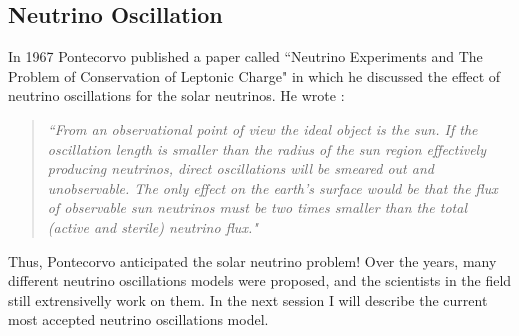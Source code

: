 \subsection{Neutrino Oscillation}

In 1967 Pontecorvo published a paper called ``Neutrino Experiments and The Problem of Conservation of Leptonic Charge" in which he discussed the effect of neutrino oscillations for the solar neutrinos. He wrote \cite{pontecorvo_1967}: 
\begin{quote}
\emph{``From an observational point of view the ideal object is the sun. If the oscillation length is smaller than the radius of the sun region effectively producing neutrinos, direct oscillations will be smeared out and unobservable. The only effect on the earth’s surface would be that the flux of observable sun neutrinos must be two times smaller than the total (active and sterile) neutrino flux."}
\end{quote}
%
Thus, Pontecorvo anticipated the solar neutrino problem!
%
Over the years, many different neutrino oscillations models were proposed, and the scientists in the field still extrensivelly work on them. In the next session I will describe the current most accepted neutrino oscillations model. 
%
